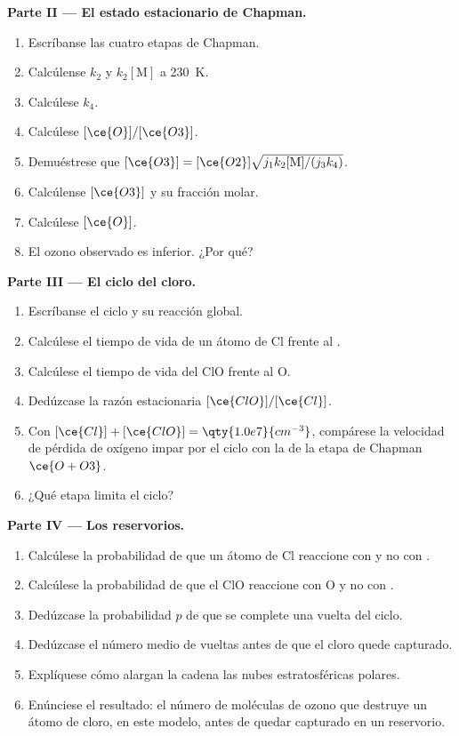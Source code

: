 \begin{problem}
\medskip\noindent\textbf{Parte II --- El estado estacionario de Chapman.}
\begin{enumerate}[resume]
  \item Escríbanse las cuatro etapas de Chapman.
  \item Calcúlense $k_2$ y $k_2[\mathrm M]$ a \qty{230}{K}.
  \item Calcúlese $k_4$.
  \item Calcúlese $[\ce{O}]/[\ce{O3}]$.
  \item Demuéstrese que $[\ce{O3}] = [\ce{O2}]\sqrt{j_1k_2[\mathrm M]/(j_3k_4)}$.
  \item Calcúlense $[\ce{O3}]$ y su fracción molar.
  \item Calcúlese $[\ce{O}]$.
  \item El ozono observado es inferior. ¿Por qué?
\end{enumerate}

\medskip\noindent\textbf{Parte III --- El ciclo del cloro.}
\begin{enumerate}[resume]
  \item Escríbanse el ciclo y su reacción global.
  \item Calcúlese el tiempo de vida de un átomo de Cl frente al .
  \item Calcúlese el tiempo de vida del ClO frente al O.
  \item Dedúzcase la razón estacionaria $[\ce{ClO}]/[\ce{Cl}]$.
  \item Con $[\ce{Cl}] + [\ce{ClO}] = \qty{1.0e7}{cm^{-3}}$, compárese la velocidad de pérdida de oxígeno impar por el
        ciclo con la de la etapa de Chapman $\ce{O + O3}$.
  \item ¿Qué etapa limita el ciclo?
\end{enumerate}

\medskip\noindent\textbf{Parte IV --- Los reservorios.}
\begin{enumerate}[resume]
  \item Calcúlese la probabilidad de que un átomo de Cl reaccione con  y no con
        .
  \item Calcúlese la probabilidad de que el ClO reaccione con O y no con .
  \item Dedúzcase la probabilidad $p$ de que se complete una vuelta del ciclo.
  \item Dedúzcase el número medio de vueltas antes de que el cloro quede capturado.
  \item Explíquese cómo alargan la cadena las nubes estratosféricas polares.
  \item Enúnciese el resultado: el número de moléculas de ozono que destruye un átomo de cloro,
        en este modelo, antes de quedar capturado en un reservorio.
\end{enumerate}
\end{problem}

